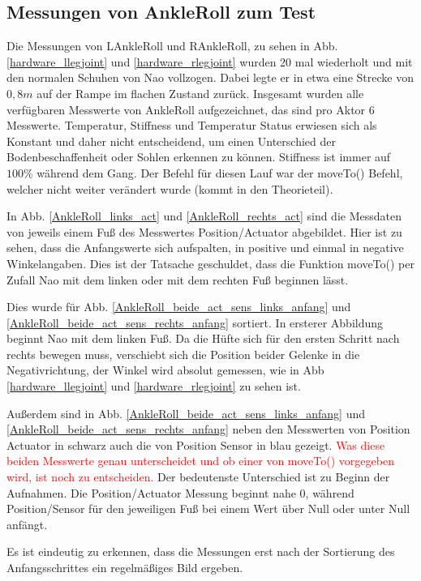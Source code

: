 \subsection{Messungen von AnkleRoll zum Test}

Die Messungen von LAnkleRoll und RAnkleRoll, zu sehen in Abb. \ref{hardware_llegjoint} und \ref{hardware_rlegjoint} wurden 20 mal wiederholt und mit den normalen Schuhen von Nao vollzogen. Dabei legte er in etwa eine Strecke von $0,8 \unit{m}$ auf der Rampe im flachen Zustand zurück. Insgesamt wurden alle verfügbaren Messwerte von AnkleRoll aufgezeichnet, das sind pro Aktor 6 Messwerte. Temperatur, Stiffness und Temperatur Status erwiesen sich als Konstant und daher nicht entscheidend, um einen Unterschied der Bodenbeschaffenheit oder Sohlen erkennen zu können. Stiffness ist immer auf $100\%$ während dem Gang. 
Der Befehl für diesen Lauf war der moveTo() Befehl, welcher nicht weiter verändert wurde (kommt in den Theorieteil).


In Abb. \ref{AnkleRoll_links_act} und \ref{AnkleRoll_rechts_act} sind die Messdaten von jeweils einem Fuß des Messwertes Position/Actuator abgebildet. Hier ist zu sehen, dass die Anfangswerte sich aufspalten, in positive und einmal in negative Winkelangaben. Dies ist der Tatsache geschuldet, dass die Funktion moveTo() per Zufall Nao mit dem linken oder mit dem rechten Fuß beginnen lässt. 

Dies wurde für Abb. \ref{AnkleRoll_beide_act_sens_links_anfang} und \ref{AnkleRoll_beide_act_sens_rechts_anfang} sortiert. In ersterer Abbildung beginnt Nao mit dem linken Fuß. Da die Hüfte sich für den ersten Schritt nach rechts bewegen muss, verschiebt sich die Position beider Gelenke in die Negativrichtung, der Winkel wird absolut gemessen, wie in Abb \ref{hardware_llegjoint} und \ref{hardware_rlegjoint} zu sehen ist. 

Außerdem sind in Abb. \ref{AnkleRoll_beide_act_sens_links_anfang} und \ref{AnkleRoll_beide_act_sens_rechts_anfang} neben den Messwerten von Position Actuator in schwarz auch die von Position Sensor in blau gezeigt. \textcolor{red}{Was diese beiden Messwerte genau unterscheidet und ob einer von moveTo() vorgegeben wird, ist noch zu entscheiden.} Der bedeutenste Unterschied ist zu Beginn der Aufnahmen. Die Position/Actuator Messung beginnt nahe 0, während Position/Sensor für den jeweiligen Fuß bei einem Wert über Null oder unter Null anfängt. 

Es ist eindeutig zu erkennen, dass die Messungen erst nach der Sortierung des Anfangsschrittes ein regelmäßiges Bild ergeben. 

